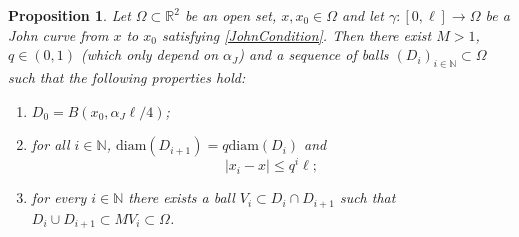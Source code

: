\documentclass[12pt]{article}
\newtheorem{proposition}[theorem]{Proposition}
\theoremstyle{definition}
\theoremstyle{remark}
\numberwithin{equation}{section}
\newcommand{\R}{\mathbb{R}}
\newcommand{\N}{\mathbb{N}}
\begin{document}
\begin{proposition}
    \label{Chain}
    Let $\Omega\subset\R^2$ be an open set, $x,x_0\in\Omega$ and let $\gamma \colon [0,\ell] \longrightarrow \Omega$ be
    a John curve from $x$ to $x_0$ satisfying \eqref{JohnCondition}. Then there exist $M>1$, $q \in (0,1)$ (which only
    depend on $\alpha_J$) and a sequence of balls $(D_i)_{i\in\N} \subset\Omega$ such that the following properties hold:
    \begin{enumerate}[label=\roman*)]
        \item\label{Chain1} $D_0=B(x_0,\alpha_J \ell/4)$;
        \item\label{Chain2} for all $i \in \N$, $\mathrm{diam}(D_{i+1})=q \mathrm{diam}(D_i)$ and
            \begin{equation}\label{eqeq13}
                |x_i-x|\leq q^i\ell;
            \end{equation}
        \item\label{Chain4} for every $i\in\N$ there exists a ball  $V_i\subset D_i\cap D_{i+1}$ such that $D_i\cup D_{i+1}\subset MV_i \subset \Omega$. 
    \end{enumerate}
\end{proposition}
\end{document}
